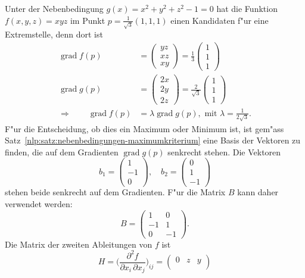 \begin{beispiel}
Unter der Nebenbedingung $g(x)=x^2+y^2+z^2-1=0$ hat die Funktion
$f(x,y,z)=xyz$ im Punkt $p=\frac1{\sqrt{3}}(1,1,1)$ einen Kandidaten
f"ur eine Extremstelle, denn dort ist
\begin{align*}
\operatorname{grad}f(p)
&=\begin{pmatrix}yz\\xz\\xy\end{pmatrix}
=\frac13\begin{pmatrix}1\\1\\1\end{pmatrix}
\\
\operatorname{grad}g(p)
&=\begin{pmatrix}2x\\2y\\2z\end{pmatrix}
=\frac2{\sqrt{3}}\begin{pmatrix}1\\1\\1\end{pmatrix}
\\
\Rightarrow\qquad
\operatorname{grad}f(p)
&=\lambda\operatorname{grad}g(p),\text{ mit }\lambda=\frac1{2\sqrt{3}}.
\end{align*}
F"ur die Entscheidung, ob dies ein Maximum oder Minimum ist, ist gem"ass
Satz~\ref{nlp:satz:nebenbedingungen-maximumkriterium}
eine Basis der Vektoren zu finden, die auf dem Gradienten
$\operatorname{grad}g(p)$ senkrecht stehen. Die Vektoren
\[
b_1=\begin{pmatrix} 1\\-1\\0\end{pmatrix},
\quad
b_2=\begin{pmatrix}0\\1\\-1\end{pmatrix}
\]
stehen beide senkrecht auf dem Gradienten. F"ur die Matrix $B$ kann daher
verwendet werden:
\[
B=
\begin{pmatrix}
 1& 0\\
-1& 1\\
 0&-1
\end{pmatrix}.
\]
Die Matrix der zweiten Ableitungen von $f$ ist
\[
H
=
\biggl(\frac{\partial^2f}{\partial x_i\,\partial x_j}\biggr)_{ij}
=
\begin{pmatrix}
0&z&y\\

\end{pmatrix}\]
\end{beispiel}
